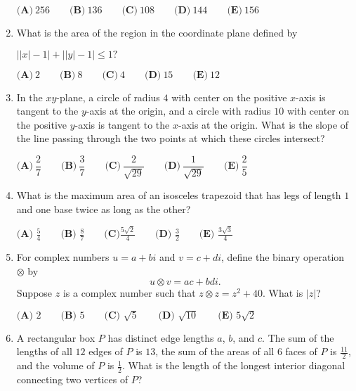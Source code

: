 \documentclass{article}
\begin{document}
\begin{enumerate}[label=\arabic*., itemsep=0.5em]
\(\textbf{(A)}\ 256 \qquad\textbf{(B)}\ 136 \qquad\textbf{(C)}\ 108 \qquad\textbf{(D)}\ 144 \qquad\textbf{(E)}\ 156\)\par \vspace{0.5em}\item What is the area of the region in the coordinate plane defined by

\(\left||x|-1\right|+\left||y|-1\right|\leq 1?\)

\(\textbf{(A)}~2\qquad\textbf{(B)}~8\qquad\textbf{(C)}~4\qquad\textbf{(D)}~15\qquad\textbf{(E)}~12\)\par \vspace{0.5em}\item In the \(xy\)-plane, a circle of radius \(4\) with center on the positive \(x\)-axis is tangent to the \(y\)-axis at the origin, and a circle with radius \(10\) with center on the positive \(y\)-axis is tangent to the \(x\)-axis at the origin. What is the slope of the line passing through the two points at which these circles intersect?

\(\textbf{(A)}\ \dfrac{2}{7} \qquad\textbf{(B)}\ \dfrac{3}{7}  \qquad\textbf{(C)}\ \dfrac{2}{\sqrt{29}}  \qquad\textbf{(D)}\ \dfrac{1}{\sqrt{29}}  \qquad\textbf{(E)}\ \dfrac{2}{5}\)\par \vspace{0.5em}\item What is the maximum area of an isosceles trapezoid that has legs of length \(1\) and one base twice as long as the other?

\(\textbf{(A) }\frac 54 \qquad \textbf{(B) } \frac 87 \qquad \textbf{(C)} \frac{5\sqrt2}4 \qquad \textbf{(D) } \frac 32  \qquad \textbf{(E) } \frac{3\sqrt3}4\)\par \vspace{0.5em}\item For complex numbers \(u=a+bi\) and \(v=c+di\), define the binary operation \(\otimes\) by
\begin{equation*}
u\otimes v=ac+bdi.
\end{equation*}
Suppose \(z\) is a complex number such that \(z\otimes z=z^{2}+40\). What is \(|z|\)?

\(\textbf{(A) }2\qquad\textbf{(B) }5\qquad\textbf{(C) }\sqrt{5}\qquad\textbf{(D) }\sqrt{10}\qquad\textbf{(E) }5\sqrt{2}\)\par \vspace{0.5em}\item A rectangular box \(P\) has distinct edge lengths \(a\), \(b\), and \(c\). The sum of the lengths of all \(12\) edges of \(P\) is \(13\), the sum of the areas of all \(6\) faces of \(P\) is \(\frac{11}{2}\), and the volume of \(P\) is \(\frac{1}{2}\). What is the length of the longest interior diagonal connecting two vertices of \(P\)?


\end{enumerate}
\end{document}
